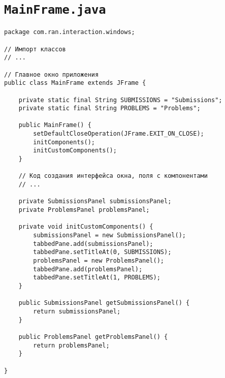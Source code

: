\section*{\texttt{MainFrame.java}}
\begin{verbatim}
package com.ran.interaction.windows;

// Импорт классов
// ...

// Главное окно приложения
public class MainFrame extends JFrame {

    private static final String SUBMISSIONS = "Submissions";
    private static final String PROBLEMS = "Problems";
    
    public MainFrame() {
        setDefaultCloseOperation(JFrame.EXIT_ON_CLOSE);
        initComponents();
        initCustomComponents();
    }

    // Код создания интерфейса окна, поля с компонентами
    // ...

    private SubmissionsPanel submissionsPanel;
    private ProblemsPanel problemsPanel;

    private void initCustomComponents() {
        submissionsPanel = new SubmissionsPanel();
        tabbedPane.add(submissionsPanel);
        tabbedPane.setTitleAt(0, SUBMISSIONS);
        problemsPanel = new ProblemsPanel();
        tabbedPane.add(problemsPanel);
        tabbedPane.setTitleAt(1, PROBLEMS);
    }
    
    public SubmissionsPanel getSubmissionsPanel() {
        return submissionsPanel;
    }

    public ProblemsPanel getProblemsPanel() {
        return problemsPanel;
    }
    
}
\end{verbatim}

